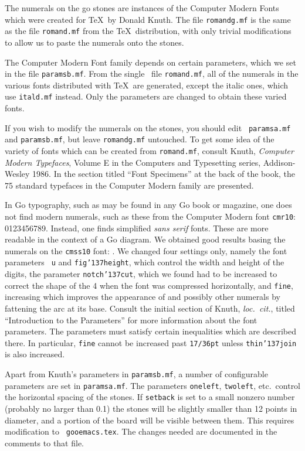 The numerals on the go stones are instances of the Computer Modern Fonts
which were created for \TeX\ by Donald Knuth. The file {\tt romandg.mf}
is the same as the file {\tt romand.mf} from the \TeX\ distribution,
with only trivial modifications to allow us to paste the numerals onto
the stones.

The Computer Modern Font family depends on certain parameters, which we set in
the file {\tt paramsb.mf}. From the single \metafont\ file {\tt romand.mf},
all of the numerals in the various fonts distributed with
\TeX\ are generated, except the italic ones, which use {\tt itald.mf} instead.
Only the parameters are changed to obtain these varied fonts.

If you wish to modify the numerals on the stones, you should edit {\tt
paramsa.mf} and {\tt paramsb.mf}, but leave {\tt romandg.mf} untouched. To get
some idea of the variety of fonts which can be created from {\tt romand.mf},
consult Knuth, {\it Computer Modern Typefaces}, Volume E in the Computers and
Typesetting series, Addison-Wesley 1986. In the section titled ``Font
Specimens'' at the back of the book, the 75 standard typefaces in the Computer
Modern family are presented.

In Go typography, such as may be found in any Go book or
magazine, one does not find modern numerals, such as these from the Computer
Modern font {\tt cmr10}: 0123456789. Instead, one finds simplified {\it sans
serif\/} fonts. These are more readable in the context of a Go diagram. We
obtained good results basing the numerals on the {\tt cmss10} font: {}.  We changed four settings only, namely the font parameters {\tt
u} and {\tt fig\char'137height}, which control the width and height of the
digits, the parameter {\tt notch\char'137cut}, which we found had to be
increased to correct the shape of the 4 when the font was compressed
horizontally, and {\tt fine}, increasing which improves the appearance
of  and possibly other numerals by fattening the
arc at its base. Consult the initial section of Knuth, {\it loc.\ cit.},
titled ``Introduction to the Parameters'' for more information about the font
parameters. The parameters must satisfy certain inequalities which are
described there. In particular, {\tt fine} cannot be increased past 
{\tt 17/36pt} unless {\tt thin\char'137join} is also increased.

Apart from Knuth's parameters in {\tt paramsb.mf}, a number of configurable
parameters are set in {\tt paramsa.mf}. The parameters {\tt oneleft}, 
{\tt twoleft}, etc.\ control the horizontal spacing of the stones. If 
{\tt setback} is set to a small nonzero number (probably no larger than 0.1)
the stones will be slightly smaller than 12 points in diameter, and a portion
of the board will be visible between them. This requires modification to {\tt
gooemacs.tex}.  The changes needed are documented in the comments to that
file. 

